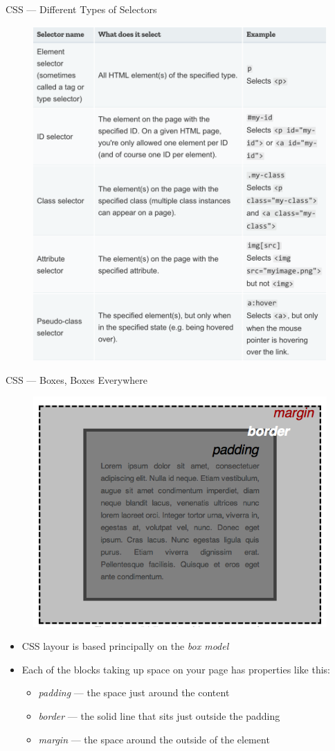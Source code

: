 \documentclass[aspectratio=169]{beamer}
\begin{document}
\begin{darkframes}
    \begin{frame}{CSS — Different Types of Selectors}
        \begin{figure}[h]
            \begin{flushleft}
            \includegraphics[width=0.4\linewidth]{resources/css-different-selectors.png}
            \end{flushleft}
        \end{figure}
    \end{frame}
    
    \begin{frame}{CSS — Boxes, Boxes Everywhere}
        \begin{figure}[h]
            \centering
            \includegraphics[width=0.35\linewidth]{resources/box-model.png}
        \end{figure}
        \begin{itemize}
            \item CSS layour is based principally on the \textit{box model}
            \item Each of the blocks taking up space on your page has properties like this:
            \begin{itemize}
                \item \textit{padding} — the space just around the content
                \item \textit{border} — the solid line that sits just outside the padding
                \item \textit{margin} — the space around the outside of the element
            \end{itemize}
        \end{itemize}
    \end{frame}
    

\end{darkframes}
\end{document}

